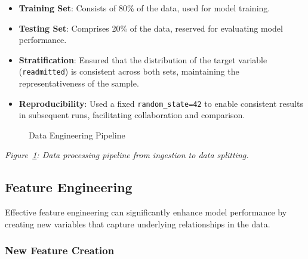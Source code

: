 \documentclass{article}
\begin{document}
\begin{itemize}[leftmargin=*]
    \item \textbf{Training Set}: Consists of 80\% of the data, used for model training.
    \item \textbf{Testing Set}: Comprises 20\% of the data, reserved for evaluating model performance.
    \item \textbf{Stratification}: Ensured that the distribution of the target variable (\texttt{readmitted}) is consistent across both sets, maintaining the representativeness of the sample.
    \item \textbf{Reproducibility}: Used a fixed \texttt{random\_state=42} to enable consistent results in subsequent runs, facilitating collaboration and comparison.
\end{itemize}

\begin{figure}[H]
    \centering
    \caption{Data Engineering Pipeline}\label{fig:data_engineering_pipeline}
\end{figure}

\textit{Figure~\ref{fig:data_engineering_pipeline}: Data processing pipeline from ingestion to data splitting.}

\subsection{Feature Engineering}

Effective feature engineering can significantly enhance model performance by creating new variables that capture underlying relationships in the data.

\subsubsection{New Feature Creation}
\end{document}
